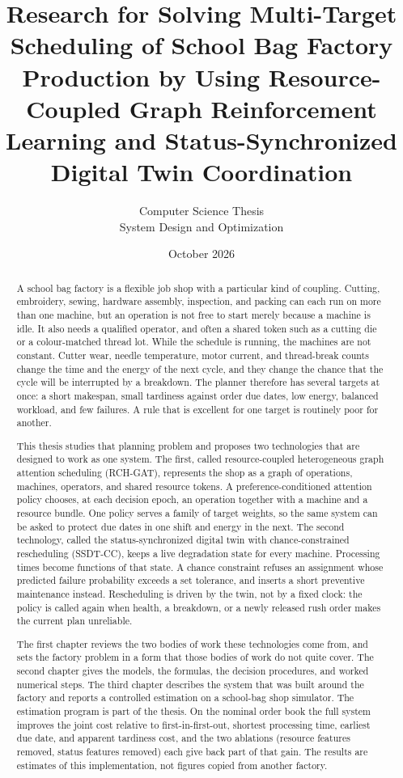 \documentclass[12pt,a4paper]{report}
\title{Research for Solving Multi-Target Scheduling of School Bag Factory Production by Using Resource-Coupled Graph Reinforcement Learning and Status-Synchronized Digital Twin Coordination}
\author{Computer Science Thesis\\System Design and Optimization}
\date{October 2026}
\newcommand{\1}{\mathbf{1}}
\begin{document}
\maketitle

\begin{abstract}
\noindent
A school bag factory is a flexible job shop with a particular kind of coupling. Cutting, embroidery, sewing, hardware assembly, inspection, and packing can each run on more than one machine, but an operation is not free to start merely because a machine is idle. It also needs a qualified operator, and often a shared token such as a cutting die or a colour-matched thread lot. While the schedule is running, the machines are not constant. Cutter wear, needle temperature, motor current, and thread-break counts change the time and the energy of the next cycle, and they change the chance that the cycle will be interrupted by a breakdown. The planner therefore has several targets at once: a short makespan, small tardiness against order due dates, low energy, balanced workload, and few failures. A rule that is excellent for one target is routinely poor for another.

This thesis studies that planning problem and proposes two technologies that are designed to work as one system. The first, called resource-coupled heterogeneous graph attention scheduling (RCH-GAT), represents the shop as a graph of operations, machines, operators, and shared resource tokens. A preference-conditioned attention policy chooses, at each decision epoch, an operation together with a machine and a resource bundle. One policy serves a family of target weights, so the same system can be asked to protect due dates in one shift and energy in the next. The second technology, called the status-synchronized digital twin with chance-constrained rescheduling (SSDT-CC), keeps a live degradation state for every machine. Processing times become functions of that state. A chance constraint refuses an assignment whose predicted failure probability exceeds a set tolerance, and inserts a short preventive maintenance instead. Rescheduling is driven by the twin, not by a fixed clock: the policy is called again when health, a breakdown, or a newly released rush order makes the current plan unreliable.

The first chapter reviews the two bodies of work these technologies come from, and sets the factory problem in a form that those bodies of work do not quite cover. The second chapter gives the models, the formulas, the decision procedures, and worked numerical steps. The third chapter describes the system that was built around the factory and reports a controlled estimation on a school-bag shop simulator. The estimation program is part of the thesis. On the nominal order book the full system improves the joint cost relative to first-in-first-out, shortest processing time, earliest due date, and apparent tardiness cost, and the two ablations (resource features removed, status features removed) each give back part of that gain. The results are estimates of this implementation, not figures copied from another factory.
\end{abstract}
\end{document}
